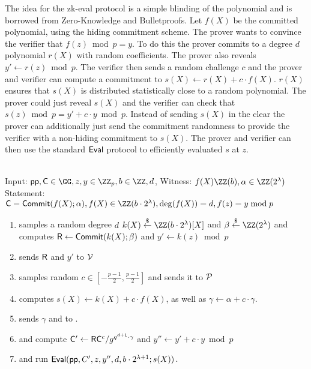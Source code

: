 The idea for the zk-eval protocol is a simple blinding of the polynomial and is borrowed from Zero-Knowledge \cite{EPRINT:ChiForSpo17} and Bulletproofs\cite{EC:BCCGP16,SP:BBBPWM18}. Let $f(X)$ be the committed polynomial, using the hiding commitment scheme. The prover wants to convince the verifier that $f(z)\bmod p=y$. To do this the prover commits to a degree $d$ polynomial $r(X)$ with random coefficients. The prover also reveals $y'\gets r(z)\bmod p$. The verifier then sends a random challenge $c$ and the prover and verifier can compute a commitment to $s(X)\gets r(X)+c\cdot f(X)$. $r(X)$ ensures that $s(X)$ is distributed statistically close to a random polynomial. The prover could just reveal $s(X)$ and the verifier can check that $s(z)\bmod p=y'+c \cdot y\bmod p$. Instead of sending $s(X)$ in the clear the prover can additionally just send the commitment randomness to provide the verifier with a non-hiding commitment to $s(X)$. The prover and verifier can then use the standard $\textsf{{Eval}}$ protocol to efficiently evaluated $s$ at $z$.
 \noindent\begin{mdframed}[userdefinedwidth=\textwidth]
\begin{minipage}{\textwidth}
	\begin{flushleft}
	\\
	Input: $\crs,\gr{C} \in \GG,z,y \in \ZZ_p, b\in \ZZ,d$, Witness: $f(X) \ZZ(b),\alpha \in \ZZ(2^\lambda)$\\
	Statement: $\gr{C}=\commit(f(X);\alpha),f(X) \in \ZZ(b\cdot 2^\lambda),\deg(f(X))=d, f(z)=y \bmod p$
	\begin{enumerate}[nolistsep]
		    \item \prover samples a random degree $d$ $k(X) \sample \ZZ(b\cdot 2^\lambda)[X]$ and $\beta \sample \ZZ(2^\lambda)$ and computes $\mathsf{R}\gets \textsf{{Commit}}(k(X);\beta)$ and $y'\gets k(z) \bmod p$
		    \item \prover sends $\mathsf{R}$ and $y'$ to $\mathcal{V}$
		    \item \verifier samples random $c\in [-\frac{p-1}{2},\frac{p-1}{2}]$ and sends it to $\mathcal{P}$
		    \item \prover computes $s(X)\gets k(X) + c \cdot f(X)$, as well as $\gamma\gets \alpha+ c\cdot \gamma$. 
		    \item \prover sends $\gamma$ and to \verifier.
		    \item \prover and \verifier compute $\mathsf{C}'\gets \mathsf{R}\mathsf{C}^c/g^{q^{d+1}\cdot \gamma}$ and $y''\gets y'+c \cdot y \bmod p$
		    \item \prover and \verifier run $\textsf{{Eval}}(\textsf{pp},C',z,y'',d,b\cdot 2^{\lambda+1};s(X))$.
		   		\end{enumerate}
	\end{flushleft}
\end{minipage}
\end{mdframed}



